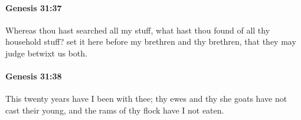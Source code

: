 		\paragraph{Genesis 31:37} %
			\label{GENESIS-31-37}

			Whereas thou hast searched all my stuff, what hast thou found of all thy household stuff? set it here before my brethren and thy brethren, that they may judge betwixt us both.


		\paragraph{Genesis 31:38} %
			\label{GENESIS-31-38}

			This twenty years have I been with thee; thy ewes and thy she goats have not cast their young, and the rams of thy flock have I not eaten.


